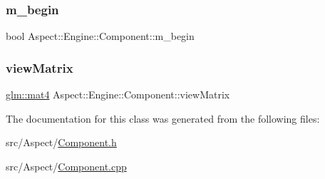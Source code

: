 \subsubsection{\texorpdfstring{m\+\_\+begin}{m\_begin}}
{\footnotesize\ttfamily bool Aspect\+::\+Engine\+::\+Component\+::m\+\_\+begin\hspace{0.3cm}{\ttfamily [private]}}

\mbox{\label{class_aspect_1_1_engine_1_1_component_a8307884a0e42764fd72af572e4ffdc7f}} 
\subsubsection{\texorpdfstring{view\+Matrix}{viewMatrix}}
{\footnotesize\ttfamily \mbox{\hyperlink{group__core__types_ga7dcd2365c2e368e6af5b7adeb6a9c8df}{glm\+::mat4}} Aspect\+::\+Engine\+::\+Component\+::view\+Matrix\hspace{0.3cm}{\ttfamily [private]}}



The documentation for this class was generated from the following files\+:\begin{DoxyCompactItemize}
\item 
src/\+Aspect/\mbox{\hyperlink{_component_8h}{Component.\+h}}\item 
src/\+Aspect/\mbox{\hyperlink{_component_8cpp}{Component.\+cpp}}\end{DoxyCompactItemize}
